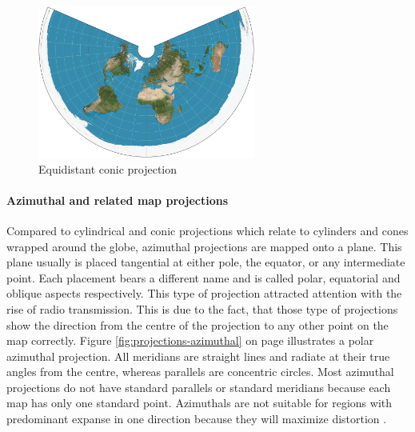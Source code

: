 \begin{description}
\begin{figure}[!htb]
\centering
\includegraphics[height=5cm,keepaspectratio]{images/methods/projections/equidistant.jpg}
\caption[
    Equidistant conic projection, Urldate: 07.2016 \newline
    \small\texttt{\url{https://upload.wikimedia.org/wikipedia/commons/d/d8/Equidistant_conic_projection_SW.JPG}}.
]{Equidistant conic projection}
\label{fig:projections-equidistant}
\end{figure}

\end{description}
\paragraph{Azimuthal and related map projections}
Compared to cylindrical and conic projections which relate to cylinders and cones wrapped around the globe, azimuthal projections are mapped onto a plane. This plane usually is placed tangential at either pole, the equator, or any intermediate point. Each placement bears a different name and is called polar, equatorial and oblique aspects respectively. This type of projection attracted attention with the rise of radio transmission. This is due to the fact, that those type of projections show the direction from the centre of the projection to any other point on the map correctly. Figure \ref{fig:projections-azimuthal} on page \pageref{fig:projections-azimuthal} illustrates a polar azimuthal projection. All meridians are straight lines and radiate at their true angles from the centre, whereas parallels are concentric circles. Most azimuthal projections do not have standard parallels or standard meridians because each map has only one standard point. Azimuthals are not suitable for regions with predominant expanse in one direction because they will maximize distortion .

